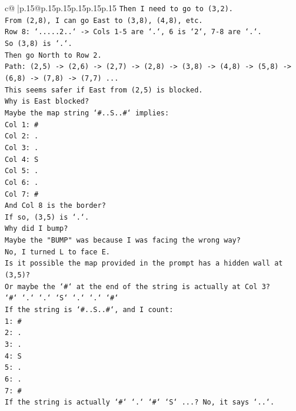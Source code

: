 \documentclass{article}
\begin{document}
{\begin{supertabular}{c@{$\;$}|p{.15\linewidth}@{}p{.15\linewidth}p{.15\linewidth}p{.15\linewidth}p{.15\linewidth}p{.15\linewidth}}
{{{\texttt{Then I need to go to (3,2).} \\
\texttt{From (2,8), I can go East to (3,8), (4,8), etc.} \\
\texttt{Row 8: `.....2..` {-}> Cols 1{-}5 are `.`, 6 is `2`, 7{-}8 are `.`.} \\
\texttt{So (3,8) is `.`.} \\
\texttt{Then go North to Row 2.} \\
\texttt{Path: (2,5) {-}> (2,6) {-}> (2,7) {-}> (2,8) {-}> (3,8) {-}> (4,8) {-}> (5,8) {-}> (6,8) {-}> (7,8) {-}> (7,7) ...} \\
\texttt{This seems safer if East from (2,5) is blocked.} \\
\texttt{Why is East blocked?} \\
\texttt{Maybe the map string `\#..S..\#` implies:} \\
\texttt{Col 1: \#} \\
\texttt{Col 2: .} \\
\texttt{Col 3: .} \\
\texttt{Col 4: S} \\
\texttt{Col 5: .} \\
\texttt{Col 6: .} \\
\texttt{Col 7: \#} \\
\texttt{And Col 8 is the border?} \\
\texttt{If so, (3,5) is `.`.} \\
\texttt{Why did I bump?} \\
\texttt{Maybe the "BUMP" was because I was facing the wrong way?} \\
\texttt{No, I turned L to face E.} \\
\texttt{Is it possible the map provided in the prompt has a hidden wall at (3,5)?} \\
\texttt{Or maybe the `\#` at the end of the string is actually at Col 3?} \\
\texttt{`\#` `.` `.` `S` `.` `.` `\#`} \\
\texttt{If the string is `\#..S..\#`, and I count:} \\
\texttt{1: \#} \\
\texttt{2: .} \\
\texttt{3: .} \\
\texttt{4: S} \\
\texttt{5: .} \\
\texttt{6: .} \\
\texttt{7: \#} \\
\texttt{If the string is actually `\#` `.` `\#` `S` ...? No, it says `..`.} \\
}}}
\end{supertabular}}
\end{document}
